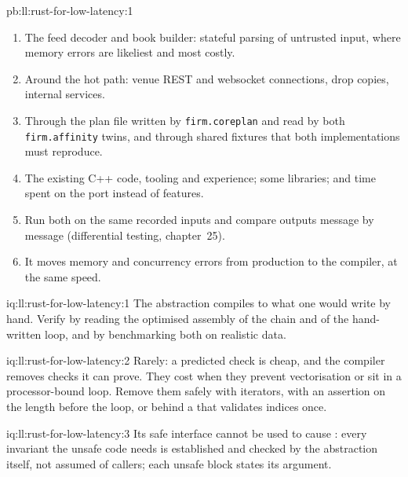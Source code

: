 \begin{solution}{pb:ll:rust-for-low-latency:1}
\begin{enumerate}
\item The feed decoder and book builder: stateful parsing of untrusted input, where memory errors are likeliest and most
costly.
\item Around the hot path: venue REST and websocket connections, drop copies, internal services.
\item Through the plan file written by \texttt{firm.coreplan} and read by both \texttt{firm.affinity} twins, and through shared
fixtures that both implementations must reproduce.
\item The existing C++ code, tooling and experience; some libraries; and time spent on the port instead of features.
\item Run both on the same recorded inputs and compare outputs message by message (differential testing, chapter~25).
\item It moves memory and concurrency errors from production to the compiler, at the same speed.
\end{enumerate}
\end{solution}

\begin{solution}{iq:ll:rust-for-low-latency:1}
The abstraction compiles to what one would write by hand. Verify by reading the optimised assembly of the chain and of the
hand-written loop, and by benchmarking both on realistic data.
\end{solution}

\begin{solution}{iq:ll:rust-for-low-latency:2}
Rarely: a predicted check is cheap, and the compiler removes checks it can prove. They cost when they prevent
vectorisation or sit in a processor-bound loop. Remove them safely with iterators, with an assertion on the length before
the loop, or behind a  that validates indices once.
\end{solution}

\begin{solution}{iq:ll:rust-for-low-latency:3}
Its safe interface cannot be used to cause : every invariant the unsafe code needs is established and
checked by the abstraction itself, not assumed of callers; each unsafe block states its argument.
\end{solution}

